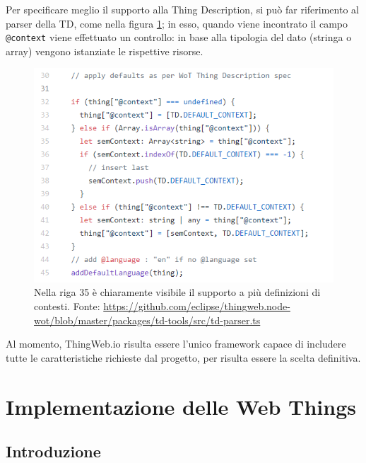 \documentclass[12pt,a4paper,openright,oneside]{report}
\begin{document}
Per specificare meglio il supporto alla Thing Description, si può far riferimento al parser della TD, come nella figura \ref{fig:context-ok-thingweb_2}; in esso, quando viene incontrato il campo \texttt{@context} viene effettuato un controllo: in base alla tipologia del dato (stringa o array) vengono istanziate le rispettive risorse.\\

\begin{figure}[h]
	\centering
	\includegraphics[scale=0.9]{eps/context_ok_thingweb_2.png}
	\caption{Nella riga 35 è chiaramente visibile il supporto a più definizioni di contesti. Fonte: \url{https://github.com/eclipse/thingweb.node-wot/blob/master/packages/td-tools/src/td-parser.ts}}
	\label{fig:context-ok-thingweb_2}
\end{figure}


Al momento, ThingWeb.io risulta essere l'unico framework capace di includere tutte le caratteristiche richieste dal progetto, per risulta essere la scelta definitiva.


\clearpage{\pagestyle{empty}\cleardoublepage}
\chapter{Implementazione delle Web Things}           %
\lhead[\fancyplain{}{\bfseries\thepage}]{\fancyplain{}{\bfseries\rightmark}}  

\section{Introduzione}
\end{document}
